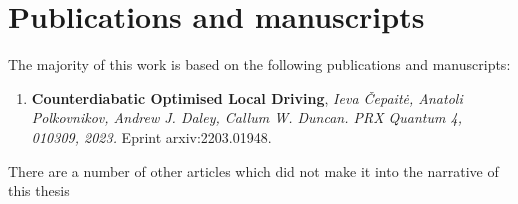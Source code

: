 \chapter{Publications and manuscripts}

The majority of this work is based on the following publications and manuscripts:

\begin{enumerate}
    \item \textbf{Counterdiabatic Optimised Local Driving}, \textit{Ieva Čepaitė, Anatoli Polkovnikov, Andrew J. Daley, Callum W. Duncan. PRX Quantum 4, 010309, 2023.} Eprint arxiv:2203.01948.
\end{enumerate}

There are a number of other articles which did not make it into the narrative of this thesis 